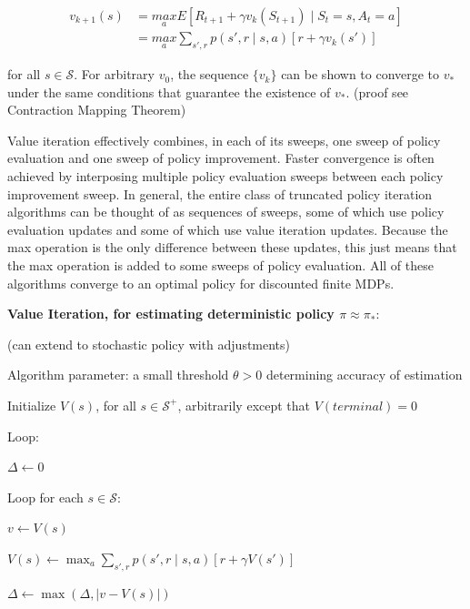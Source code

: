 \documentclass{article}
\begin{document}
\begin{equation*}
\begin{split}
v_{k + 1}(s)
& = \underset{a}{max} E[R_{t + 1} + \gamma v_k(S_{t + 1}) \mid S_t = s, A_t = a] \\
& = \underset{a}{max} \sum_{s', r} p(s', r \mid s, a) [r + \gamma v_k(s')]
\end{split}
\end{equation*}

for all \(s \in \mathcal{S}\). For arbitrary \(v_0\), the sequence \(\{ v_k \}\) can be shown to converge to \(v_*\) under the same conditions that guarantee the existence of \(v_*\). 
(proof see Contraction Mapping Theorem)

Value iteration effectively combines, in each of its sweeps, one sweep of policy evaluation and one sweep of policy improvement. 
Faster convergence is often achieved by interposing multiple policy evaluation sweeps between each policy improvement sweep. In general, 
the entire class of truncated policy iteration algorithms can be thought of as sequences of sweeps, some of which use policy evaluation updates and some of which use value iteration updates. 
Because the max operation is the only difference between these updates, this just means that the max operation is added to some sweeps of policy evaluation. 
All of these algorithms converge to an optimal policy for discounted finite MDPs.

\textbf{Value Iteration, for estimating deterministic policy \(\pi \approx \pi_*\)}:

(can extend to stochastic policy with adjustments)

Algorithm parameter: a small threshold \(\theta > 0\) determining accuracy of estimation

Initialize \(V(s)\), for all \(s \in \mathcal{S}^+\), arbitrarily except that \(V(terminal) = 0\)

Loop:

\hspace{.5cm} \(\Delta \leftarrow 0\)

\hspace{.5cm} Loop for each \(s \in \mathcal{S}\):

\hspace{1cm} \(v \leftarrow V(s)\)

\hspace{1cm} \(V(s) \leftarrow \max_a \sum_{s', r} p(s', r \mid s, a) [r + \gamma V(s')]\)

\hspace{1cm} \(\Delta \leftarrow \max(\Delta, \vert v -  V(s) \vert)\)
\end{document}
